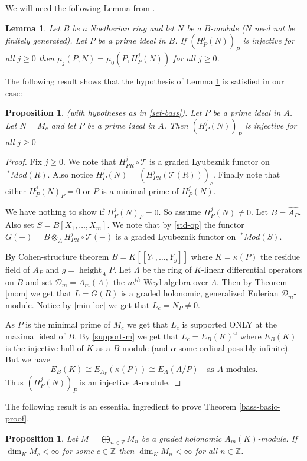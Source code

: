 \documentclass{amsart}
\newcommand{\ZZ}{\mathbb{Z} }
\newcommand{\D}{\mathcal{D} }
\newcommand{\FF}{\mathcal{T}}
\newcommand{\height}{\operatorname{height}}
\theoremstyle{plain}
\newtheorem{lemma}[theorem]{Lemma}
\newtheorem{proposition}[theorem]{Proposition}
\theoremstyle{definition}
\theoremstyle{remark}
\begin{document}
We will need the following Lemma from \cite[1.4]{Lyu-1}.
\begin{lemma}\label{lyu-lemma}
Let $B$ be a Noetherian ring and let $N$ be a $B$-module ($N$ need not be finitely generated).
Let $P$ be a prime ideal in $B$. If $(H^j_P(N))_P$ is injective for all $j \geq 0$ then
$\mu_j(P,N) = \mu_0(P,H^j_P(N))$ for all $j \geq 0$.
\end{lemma}
The following result shows that the hypothesis of Lemma \ref{lyu-lemma} is satisfied in our case:
\begin{proposition}\label{lyu-lemma-hypoth}
(with hypotheses as in \ref{set-bass}).  Let $P$ be a prime ideal in $A$.  Let $N = M_c$ and let $P$ be a prime ideal in $A$. Then $(H^j_P(N))_P$ is injective for all $j \geq 0$
\end{proposition}
\begin{proof}
Fix $j \geq 0$.
We note that $H^j_{PR}\circ\FF$ is a graded Lyubeznik functor on $\ ^*Mod(R)$. Also notice $H^j_{P}(N) = (H^j_{PR}(\FF(R)))_c$. Finally note that either 
$H^j_P(N)_P = 0$ or $P$ is a minimal prime of $H^j_P(N)$. 

We have nothing to show if $H^j_P(N)_P = 0$. So assume  $H^j_P(N) \neq 0$. 
Let $B = \widehat{A_P}$. Also 
 set $S = B[X_1,\ldots, X_m]$.
 We note that by \ref{std-op} the functor $G(-) = B \otimes_A H^j_{PR}\circ\FF(-)$ is a graded Lyubeznik functor on $ \ ^* Mod(S)$.
 
 By Cohen-structure theorem $B = K[[Y_1,\ldots, Y_g]]$ where $K = \kappa(P)$ the residue field of $A_P$  and $g = \height_A P$.
 Let $\Lambda $ be the ring of $K$-linear differential operators on $B$ and set $\D_m = A_m(\Lambda)$ the $m^{th}$-Weyl algebra
 over $\Lambda$. Then by  Theorem \ref{mom} we get that $L = G(R)$ is a graded holonomic, generalized Eulerian
 $\D_m$-module. Notice  by \ref{min-loc} we get that 
 $L_c = N_P \neq 0$. 
 
 As $P$ is the minimal prime of $M_c$ we get that $L_c$ is supported  ONLY at the maximal ideal of $B$. By \ref{support-m} we get that $L_c = E_B(K)^\alpha$ where 
 $E_B(K)$ is the injective hull of $K$ as a $B$-module (and $\alpha$ some ordinal possibly infinite). 
 But we have
 \[
 E_B(K) \cong E_{A_P}(\kappa(P)) \cong E_A(A/P) \quad \text{as $A$-modules.}
 \]
Thus $(H^j_P(N))_P$  is an injective $A$-module.
\end{proof}
The following result is an essential ingredient to prove Theorem \ref{bass-basic-proof}.
\begin{proposition}\label{bass-dim0}
Let $M = \bigoplus_{n \in \ZZ}M_n$ be a graded holonomic  $ A_m(K)$-module. If \\ $\dim_K M_c < \infty$ for some $c \in \ZZ$ then $\dim_K M_n < \infty$ for all $n \in \ZZ$.
\end{proposition}
\end{document}
